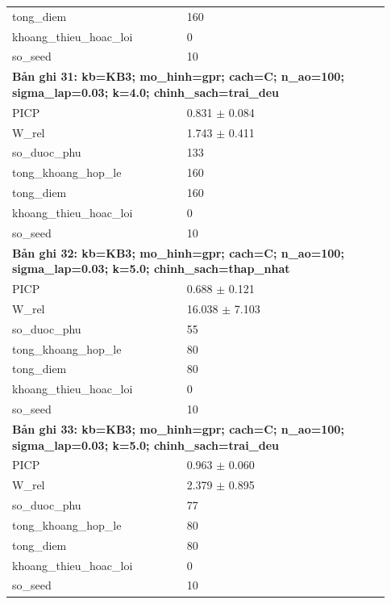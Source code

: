 \begin{longtable}{p{0.43\linewidth}p{0.50\linewidth}}
tong\_\allowbreak diem & 160 \\
khoang\_\allowbreak thieu\_\allowbreak hoac\_\allowbreak loi & 0 \\
so\_\allowbreak seed & 10 \\
\midrule
\multicolumn{2}{p{0.95\linewidth}}{\textbf{Bản ghi 31: kb=KB3; mo\_hinh=gpr; cach=C; n\_ao=100; sigma\_lap=0.03; k=4.0; chinh\_sach=trai\_deu}} \\
PICP & 0.831 $\pm$ 0.084 \\
W\_\allowbreak rel & 1.743 $\pm$ 0.411 \\
so\_\allowbreak duoc\_\allowbreak phu & 133 \\
tong\_\allowbreak khoang\_\allowbreak hop\_\allowbreak le & 160 \\
tong\_\allowbreak diem & 160 \\
khoang\_\allowbreak thieu\_\allowbreak hoac\_\allowbreak loi & 0 \\
so\_\allowbreak seed & 10 \\
\midrule
\multicolumn{2}{p{0.95\linewidth}}{\textbf{Bản ghi 32: kb=KB3; mo\_hinh=gpr; cach=C; n\_ao=100; sigma\_lap=0.03; k=5.0; chinh\_sach=thap\_nhat}} \\
PICP & 0.688 $\pm$ 0.121 \\
W\_\allowbreak rel & 16.038 $\pm$ 7.103 \\
so\_\allowbreak duoc\_\allowbreak phu & 55 \\
tong\_\allowbreak khoang\_\allowbreak hop\_\allowbreak le & 80 \\
tong\_\allowbreak diem & 80 \\
khoang\_\allowbreak thieu\_\allowbreak hoac\_\allowbreak loi & 0 \\
so\_\allowbreak seed & 10 \\
\midrule
\multicolumn{2}{p{0.95\linewidth}}{\textbf{Bản ghi 33: kb=KB3; mo\_hinh=gpr; cach=C; n\_ao=100; sigma\_lap=0.03; k=5.0; chinh\_sach=trai\_deu}} \\
PICP & 0.963 $\pm$ 0.060 \\
W\_\allowbreak rel & 2.379 $\pm$ 0.895 \\
so\_\allowbreak duoc\_\allowbreak phu & 77 \\
tong\_\allowbreak khoang\_\allowbreak hop\_\allowbreak le & 80 \\
tong\_\allowbreak diem & 80 \\
khoang\_\allowbreak thieu\_\allowbreak hoac\_\allowbreak loi & 0 \\
so\_\allowbreak seed & 10 \\

\end{longtable}
